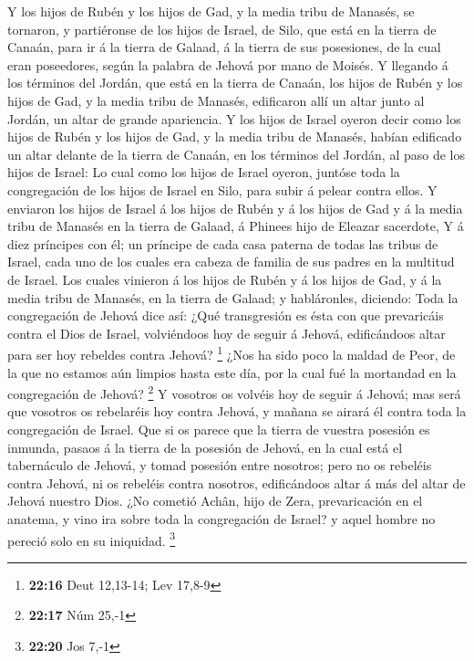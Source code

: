  Y los hijos de Rubén y los hijos de Gad, y la media tribu
de Manasés, se tornaron, y partiéronse de los hijos de Israel, de Silo,
que está en la tierra de Canaán, para ir á la tierra de Galaad, á la
tierra de sus posesiones, de la cual eran poseedores, según la palabra
de Jehová por mano de Moisés.  Y llegando á los términos
del Jordán, que está en la tierra de Canaán, los hijos de Rubén y los
hijos de Gad, y la media tribu de Manasés, edificaron allí un altar
junto al Jordán, un altar de grande apariencia.  Y los
hijos de Israel oyeron decir como los hijos de Rubén y los hijos de Gad,
y la media tribu de Manasés, habían edificado un altar delante de la
tierra de Canaán, en los términos del Jordán, al paso de los hijos de
Israel:  Lo cual como los hijos de Israel oyeron, juntóse
toda la congregación de los hijos de Israel en Silo, para subir á pelear
contra ellos.  Y enviaron los hijos de Israel á los hijos
de Rubén y á los hijos de Gad y á la media tribu de Manasés en la tierra
de Galaad, á Phinees hijo de Eleazar sacerdote,  Y á diez
príncipes con él; un príncipe de cada casa paterna de todas las tribus
de Israel, cada uno de los cuales era cabeza de familia de sus padres en
la multitud de Israel.  Los cuales vinieron á los hijos
de Rubén y á los hijos de Gad, y á la media tribu de Manasés, en la
tierra de Galaad; y habláronles, diciendo:  Toda la
congregación de Jehová dice así: ¿Qué transgresión es ésta con que
prevaricáis contra el Dios de Israel, volviéndoos hoy de seguir á
Jehová, edificándoos altar para ser hoy rebeldes contra Jehová?
\footnote{\textbf{22:16} Deut 12,13-14; Lev 17,8-9}  ¿Nos
ha sido poco la maldad de Peor, de la que no estamos aún limpios hasta
este día, por la cual fué la mortandad en la congregación de Jehová?
\footnote{\textbf{22:17} Núm 25,-1}  Y vosotros os
volvéis hoy de seguir á Jehová; mas será que vosotros os rebelaréis hoy
contra Jehová, y mañana se airará él contra toda la congregación de
Israel.  Que si os parece que la tierra de vuestra
posesión es inmunda, pasaos á la tierra de la posesión de Jehová, en la
cual está el tabernáculo de Jehová, y tomad posesión entre nosotros;
pero no os rebeléis contra Jehová, ni os rebeléis contra nosotros,
edificándoos altar á más del altar de Jehová nuestro Dios.
 ¿No cometió Achân, hijo de Zera, prevaricación en el
anatema, y vino ira sobre toda la congregación de Israel? y aquel hombre
no pereció solo en su iniquidad. \footnote{\textbf{22:20} Jos 7,-1}


